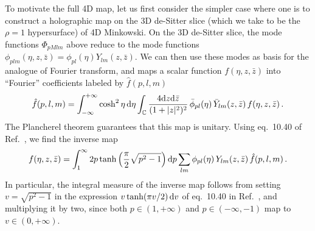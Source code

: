 \documentclass{brownthesis}
\def\dd{{\rm d}}
\begin{document}
To motivate the full 4D map, let us first consider the simpler case
where one is to construct a holographic map on the 3D de-Sitter slice
(which we take to be the $\rho=1$ hypersurface) of 4D Minkowski.
On the 3D de-Sitter slice, the mode functions $\Phi_{pMlm}$ above
reduce to the mode functions $\phi_{plm}(\eta,z,\bar{z})=\phi_{pl}(\eta)Y_{lm}(z,\bar{z})$.
We can then use these modes as basis for the analogue of Fourier transform,
and maps a scalar function $f(\eta,z,\bar{z})$ into ``Fourier''
coefficients labeled by $\hat{f}(p,l,m)$
\[
\hat{f}(p,l,m)=\int_{-\infty}^{+\infty}\cosh^{2}\eta\,\dd\eta\int_{\mathbb{C}}\frac{4\dd z\dd\bar{z}}{(1+|z|^{2})^{2}}\,\bar{\phi}_{pl}(\eta)\,\bar{Y}_{lm}(z,\bar{z})\,f(\eta,z,\bar{z})\,.
\]
The Plancherel theorem \cite{knapp2001representation} guarantees
that this map is unitary. Using eq.~10.40 of Ref.~\cite{knapp2001representation},
we find the inverse map
\[
f(\eta,z,\bar{z})=\int_{1}^{\infty}2p\tanh\left(\frac{\pi}{2}\sqrt{p^{2}-1}\right)\dd p\sum_{lm}\phi_{pl}(\eta)\,Y_{lm}(z,\bar{z})\,\hat{f}(p,l,m)\,.
\]
In particular, the integral measure of the inverse map follows from
setting $v=\sqrt{p^{2}-1}$ in the expression $v\tanh(\pi v/2)\,\dd v$ of eq.~10.40 in
Ref.~\cite{knapp2001representation}, and multiplying it by two, since
both $p\in(1,+\infty)$ and $p\in(-\infty,-1)$ map to $v\in(0,+\infty)$.
\end{document}
